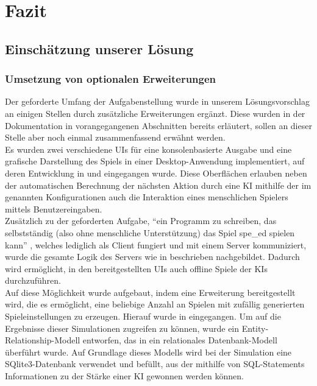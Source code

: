 \chapter{Fazit}
\label{ch:fazit}

\section{Einschätzung unserer Lösung}
\label{sec:einschaetzung}


\subsection{Umsetzung von optionalen Erweiterungen}
\label{subsec:optionale-erweiterungen}

Der geforderte Umfang der Aufgabenstellung  wurde in unserem Lösungsvorschlag an einigen
Stellen durch zusätzliche Erweiterungen ergänzt.
Diese wurden in der Dokumentation in vorangegangenen Abschnitten bereits erläutert, sollen an dieser Stelle aber noch
einmal zusammenfassend erwähnt werden. \\

Es wurden zwei verschiedene \ac{UI}s für eine konsolenbasierte Ausgabe und eine grafische Darstellung des Spiels in
einer Desktop-Anwendung implementiert, auf deren Entwicklung in  und
 eingegangen wurde.
Diese Oberflächen erlauben neben der automatischen Berechnung der nächsten Aktion durch eine \ac{KI} mithilfe der im
 genannten Konfigurationen auch die Interaktion eines menschlichen Spielers mittels
Benutzereingaben. \\

Zusätzlich zu der geforderten Aufgabe, "`ein Programm zu schreiben, das selbstständig (also ohne menschliche
Unterstützung) das Spiel spe\_ed spielen kann"' , welches lediglich als Client fungiert und
mit einem Server kommuniziert, wurde die gesamte Logik des Servers wie in 
beschrieben nachgebildet.
Dadurch wird ermöglicht, in den bereitgestellten \ac{UI}s auch offline Spiele der \ac{KI}s durchzuführen. \\

Auf diese Möglichkeit wurde aufgebaut, indem eine Erweiterung bereitgestellt wird, die es ermöglicht, eine beliebige
Anzahl an Spielen mit zufällig generierten Spieleinstellungen zu erzeugen.
Hierauf wurde in  eingegangen.
Um auf die Ergebnisse dieser Simulationen zugreifen zu können, wurde ein Entity-Relationship-Modell entworfen, das in
ein relationales Datenbank-Modell überführt wurde.
Auf Grundlage dieses Modells wird bei der Simulation eine SQlite3-Datenbank verwendet und befüllt, aus der mithilfe von
SQL-Statements Informationen zu der Stärke einer \ac{KI} gewonnen werden können. \\

